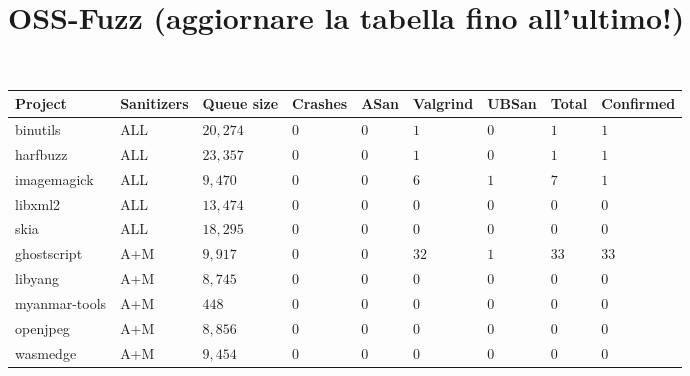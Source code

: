 \newpage
\section{OSS-Fuzz (aggiornare la tabella fino all'ultimo!)}
\ \\
\begin{adjustbox}{width=\textwidth,center}
\begin{tabular}{|l|l|l|l|l|l|l|l|l|}
\hline
\textbf{Project} & \textbf{Sanitizers} & \textbf{Queue size} & \textbf{Crashes} & \textbf{ASan} & \textbf{Valgrind} & \textbf{UBSan} & \textbf{Total} & \textbf{Confirmed}  \\ 
\hline
binutils         & ALL                 & $20,274$            & $0$              & $0$           & $1$           & $0$            & $1$             & $1$                 \\
harfbuzz         & ALL                 & $23,357$            & $0$              & $0$           & $1$           & $0$            & $1$             & $1$                 \\
imagemagick      & ALL                 & $9,470$             & $0$              & $0$           & $6$           & $1$            & $7$             & $1$                 \\
libxml2          & ALL                 & $13,474$            & $0$              & $0$           & $0$           & $0$            & $0$             & $0$                 \\
skia             & ALL                 & $18,295$            & $0$              & $0$           & $0$           & $0$            & $0$             & $0$                 \\ 
\hline
ghostscript      & A+M                 & $9,917$             & $0$              & $0$           & $32$          & $1$            & $33$            & $33$                \\
libyang          & A+M                 & $8,745$             & $0$              & $0$           & $0$           & $0$            & $0$             & $0$                 \\
myanmar-tools    & A+M                 & $448$               & $0$              & $0$           & $0$           & $0$            & $0$             & $0$                 \\
openjpeg         & A+M                 & $8,856$             & $0$              & $0$           & $0$           & $0$            & $0$             & $0$                 \\
wasmedge         & A+M                 & $9,454$             & $0$              & $0$           & $0$           & $0$            & $0$             & $0$                 \\ 

\end{tabular}
\end{adjustbox}

